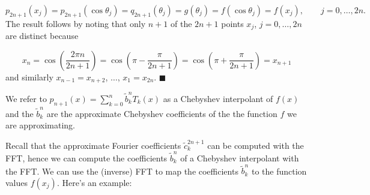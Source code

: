 \documentclass[12pt,a4paper]{article}
\begin{document}
\[
p_{2n+1}(x_j) =p_{2n+1}(\cos \theta_j) = q_{2n+1}(\theta_j) = g(\theta_j) = f(\cos\theta_j) = f(x_j), \qquad j = 0, \ldots, 2n.
\]
The result follows by noting that only $n+1$ of the $2n+1$ points $x_j$, $j = 0, \ldots, 2n$ are distinct because

\[
x_{n} = \cos\left( \frac{2\pi n}{2n + 1}  \right)= \cos\left( \pi - \frac{\pi}{2n + 1}  \right) =  \cos\left( \pi + \frac{\pi}{2n + 1}  \right) = x_{n+1}
\]
and similarly $x_{n-1} = x_{n+2}$, $\ldots$, $x_1 = x_{2n}$.  $\blacksquare$

We refer to $p_{n+1}(x) = \sum_{k=0}^{n} \tilde{b}_k^nT_k(x)$ as a Chebyshev interpolant of $f(x)$ and the $\tilde{b}_k^n$ are the approximate Chebyshev coefficients of the the function $f$ we are approximating.

Recall that the approximate Fourier coefficients $\tilde{c}^{2n+1}_k$ can be computed with the FFT, hence we can compute the coefficients $\tilde{b}^n_k$ of a Chebyshev interpolant with the FFT.  We can use the (inverse) FFT to map the coefficients $\tilde{b}^n_k$ to the function values $f(x_j)$. Here's an example:
\end{document}
